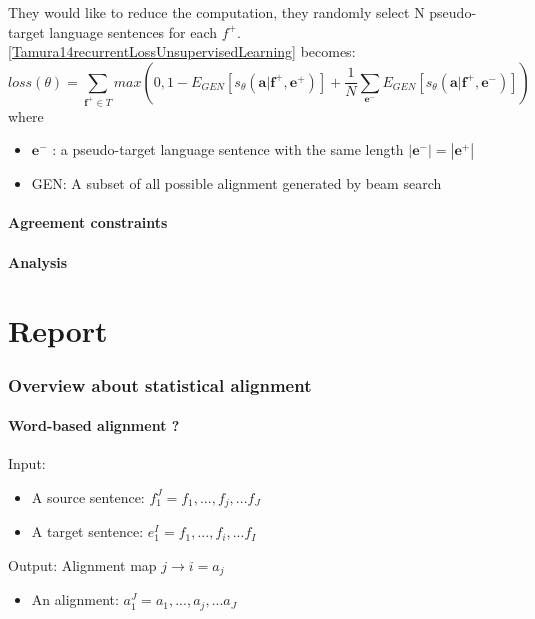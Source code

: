 \documentclass{article}
\begin{document}
They would like to reduce the computation, they randomly select N pseudo-target language sentences for each $f^+$. \eqref{Tamura14recurrentLossUnsupervisedLearning} becomes:
\begin{equation}
loss(\theta) = \sum_{\textbf{f}^+ \in T} max(0 , 1 -  E_{GEN} [s_{\theta} (\textbf{a}|\textbf{f}^+, \textbf{e}^+)]  + \frac{1}{N} \sum_{\textbf{e}^-} E_{GEN} [s_{\theta} (\textbf{a}|\textbf{f}^+, \textbf{e}^-)] )
\end{equation}
where
\begin{itemize}
\item $\textbf{e}^-$ : a pseudo-target language sentence with the same length $|\textbf{e}^-| = |\textbf{e}^+|$
\item GEN: A subset of all possible alignment generated by beam search
\end{itemize}

\subsection{Agreement constraints} 
\subsection{Analysis} 










\pagebreak 
\part{Report}

\section{Overview about statistical alignment }

\subsection{Word-based alignment ? \cite{Och2003Systematic}}
Input:
\begin{itemize}
\item A source sentence: $f_1^J = f_1,...,f_j,...f_J$
\item A target sentence: $e_1^I = f_1,...,f_i,...f_I$
\end{itemize}
Output: Alignment map $j \rightarrow i = a_j$
\begin{itemize}
\item An alignment: $a_1^J = a_1,...,a_j,...a_J$
\end{itemize}
\end{document}
